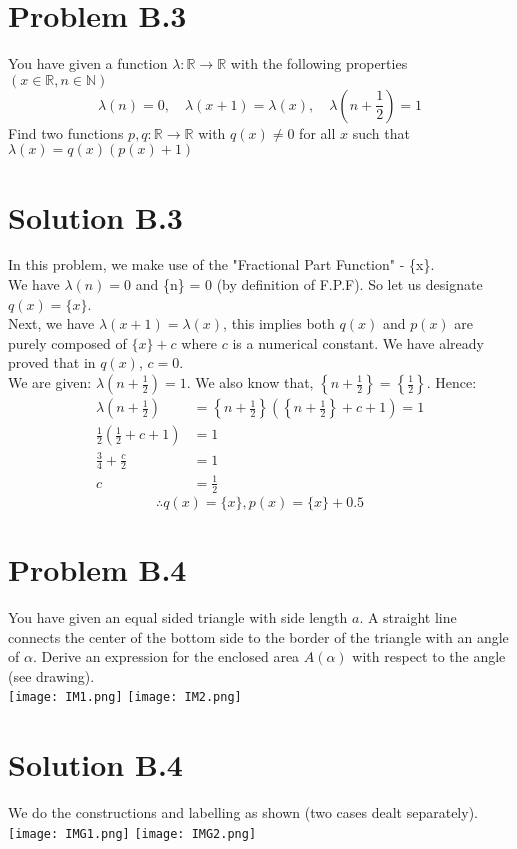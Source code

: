 \documentclass{article}
\begin{document}
\newpage
\section*{Problem B.3}
You have given a function $\lambda: \mathbb{R} \rightarrow \mathbb{R}$ with the following properties $(x \in \mathbb{R}, n \in \mathbb{N})$
$$
\lambda(n)=0, \quad \lambda(x+1)=\lambda(x), \quad \lambda\left(n+\frac{1}{2}\right)=1
$$
Find two functions $p, q: \mathbb{R} \rightarrow \mathbb{R}$ with $q(x) \neq 0$ for all $x$ such that $\lambda(x)=q(x)(p(x)+1)$
\section*{Solution B.3}
In this problem, we make use of the "Fractional Part Function" - \{x\}. \\
We have $\lambda(n)=0$ and \{n\} = 0 (by definition of F.P.F). So let us designate $q(x)=\{x\}$. \\
Next, we have $\lambda(x+1)=\lambda(x)$, this implies both $q(x)$ and $p(x)$ are purely composed of $\{x\}+c$ where $c$ is a numerical constant. We have already proved that in $q(x)$, $c=0$. \\
We are given: $\lambda\left(n+\frac{1}{2}\right)=1$. We also know that, $\left\{n+\frac{1}{2}\right\}=\left\{\frac{1}{2}\right\}$. Hence:
\begin{align*}
    \lambda\left(n+\frac{1}{2}\right)&=\left\{n+\frac{1}{2}\right\}\left(\left\{n+\frac{1}{2}\right\}+c+1\right)=1\\
    \frac{1}{2}\left(\frac{1}{2}+c+1\right)&=1 \\
    \frac{3}{4}+\frac{c}{2}&=1 \\
    c&=\frac{1}{2}
\end{align*}
\[\boxed{\therefore q(x)=\{x\}, p(x)=\{x\}+0.5}\]

\newpage
\section*{Problem B.4}
You have given an equal sided triangle with side length $a$. A straight line connects the center of the bottom side to the border of the triangle with an angle of $\alpha .$ Derive an expression for the enclosed area $A(\alpha)$ with respect to the angle (see drawing). \\
\texttt{[image: IM1.png]}
\qquad
\texttt{[image: IM2.png]}
\section*{Solution B.4}
We do the constructions and labelling as shown (two cases dealt separately).
\texttt{[image: IMG1.png]}
\qquad
\texttt{[image: IMG2.png]}
\end{document}
